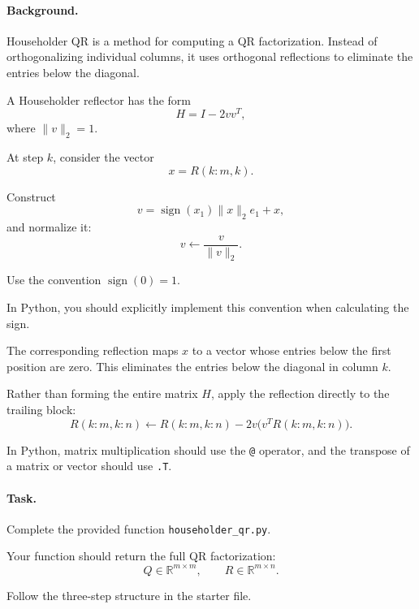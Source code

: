 \documentclass{ximera}
\begin{document}
\paragraph{Background.}

Householder QR is a method for computing a QR factorization.
Instead of orthogonalizing individual columns, it uses orthogonal
reflections to eliminate the entries below the diagonal.

A Householder reflector has the form
\[
H=I-2vv^T,
\]
where $\|v\|_2=1$.

At step $k$, consider the vector
\[
x=R(k:m,k).
\]

Construct
\[
v=\operatorname{sign}(x_1)\|x\|_2e_1+x,
\]
and normalize it:
\[
v\leftarrow\frac{v}{\|v\|_2}.
\]

Use the convention $\operatorname{sign}(0)=1$.

In Python, you should explicitly implement this convention when
calculating the sign.

The corresponding reflection maps $x$ to a vector whose entries
below the first position are zero. This eliminates the entries
below the diagonal in column $k$.

Rather than forming the entire matrix $H$, apply the reflection
directly to the trailing block:
\[
R(k:m,k:n)
\leftarrow
R(k:m,k:n)-2v\bigl(v^TR(k:m,k:n)\bigr).
\]

In Python, matrix multiplication should use the \texttt{@}
operator, and the transpose of a matrix or vector should use
\texttt{.T}.

\paragraph{Task.}

Complete the provided function \texttt{householder\_qr.py}.

Your function should return the full QR factorization:
\[
Q\in\mathbb{R}^{m\times m},
\qquad
R\in\mathbb{R}^{m\times n}.
\]

Follow the three-step structure in the starter file.
\end{document}
